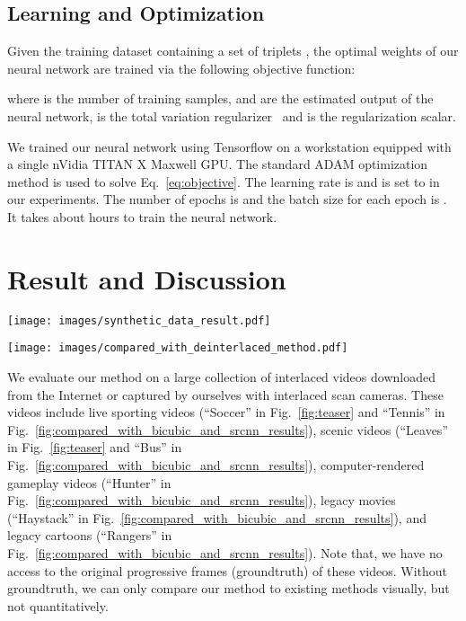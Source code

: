 \documentclass[acmtog]{acmart}
\begin{document}
\subsection{Learning and Optimization}
Given the training dataset containing a set of triplets , the optimal weights  of our neural network are trained via the following objective function:

where  is the number of training samples,  and  are the estimated output of the neural network,  is the total variation regularizer~\cite{aly2005image,johnson2016perceptual} and  is the regularization scalar.



We trained our neural network using Tensorflow on a workstation equipped with a
single nVidia TITAN X Maxwell GPU. The standard ADAM
optimization method \cite{kingma2014adam} is used to solve
Eq.~\ref{eq:objective}. The learning rate is  and  is set to
 in our experiments. The number of epochs is  and the batch size for each
epoch is . It takes about  hours to train the neural network.
 \section{Result and Discussion}
\begin{figure*}[!tp]
	\centering
\texttt{[image: images/synthetic\_data\_result.pdf]}\\
	\caption{Comparisons between bicubic interpolation, SRCNN~\cite{dong2016image} and our method. 
	}\label{fig:compared_with_bicubic_and_srcnn_results}
\end{figure*}

\begin{figure*}[!tp]
	\centering
\texttt{[image: images/compared\_with\_deinterlaced\_method.pdf]}\\
	\caption{Comparisons between the state-of-the-art deinterlacing tailored methods, including ELA~\cite{doyle1990interlaced}, WLSD~\cite{wang2014interlacing}, and FBA~\cite{vedadi2013interlacing}, with our method. }\label{fig:compared_with_deinterlaced_method}
\end{figure*}

We evaluate our method on a large collection of interlaced videos downloaded
from the Internet or captured by ourselves with interlaced scan cameras. These
videos include live sporting videos (``Soccer'' in
Fig.~\ref{fig:teaser} and ``Tennis'' in
Fig.~\ref{fig:compared_with_bicubic_and_srcnn_results}), scenic videos
(``Leaves'' in Fig.~\ref{fig:teaser} and ``Bus'' in
Fig.~\ref{fig:compared_with_bicubic_and_srcnn_results}), computer-rendered gameplay
videos (``Hunter'' in Fig.~\ref{fig:compared_with_bicubic_and_srcnn_results}),
legacy movies (``Haystack'' in
Fig.~\ref{fig:compared_with_bicubic_and_srcnn_results}), and legacy cartoons
(``Rangers'' in Fig.~\ref{fig:compared_with_bicubic_and_srcnn_results}).
Note that, we have no access to the original progressive frames (groundtruth) of 
these videos. Without groundtruth, we can only
compare our method to existing methods visually, but not quantitatively.
\end{document}

